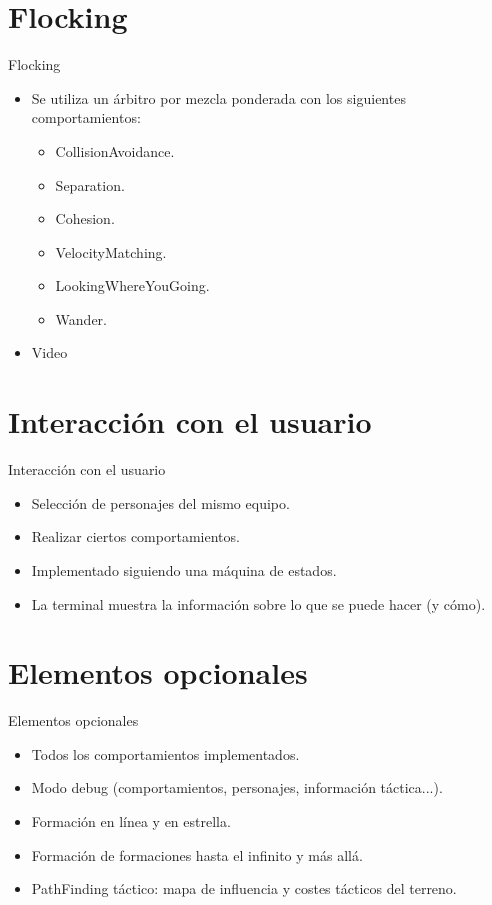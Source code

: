 \documentclass[10pt]{beamer}
\begin{document}
\section{Flocking}
\begin{frame}{Flocking}
\begin{itemize}[<+- | alert@+>]
	\item Se utiliza un árbitro por mezcla ponderada con los siguientes comportamientos:
	\begin{itemize}[<+- | alert@+>]
		\item CollisionAvoidance.
		\item Separation.
		\item Cohesion.
		\item VelocityMatching.
		\item LookingWhereYouGoing.
		\item Wander.
	\end{itemize}
	\item Video
\end{itemize}
\end{frame}

\section{Interacción con el usuario}
\begin{frame}{Interacción con el usuario}
\begin{itemize}[<+- | alert@+>]
	\item Selección de personajes del mismo equipo.
	\item Realizar ciertos comportamientos.
	\item Implementado siguiendo una máquina de estados.
	\item La terminal muestra la información sobre lo que se puede hacer (y cómo).
\end{itemize}
\end{frame}

\section{Elementos opcionales}
\begin{frame}{Elementos opcionales}
\begin{itemize}[<+- | alert@+>]
	\item Todos los comportamientos implementados.
	\item Modo debug (comportamientos, personajes, información táctica...).
	\item Formación en línea y en estrella.
	\item Formación de formaciones hasta el infinito y más allá.
	\item PathFinding táctico: mapa de influencia y costes tácticos del terreno.
\end{itemize}
\end{frame}
\end{document}
